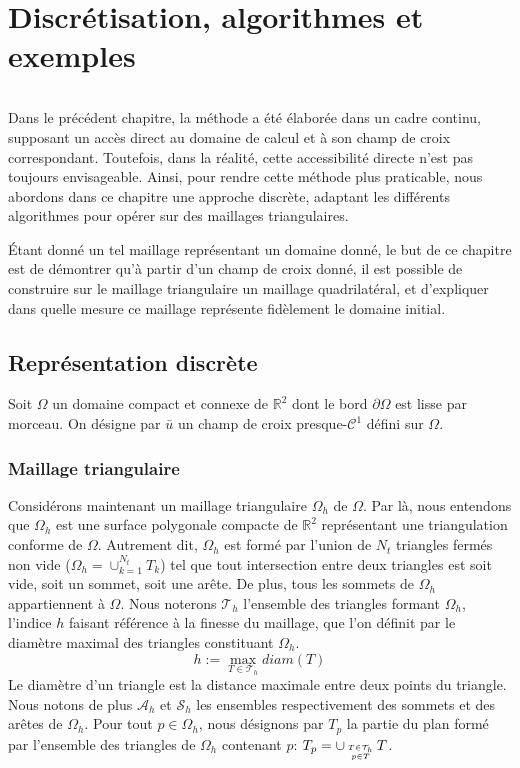 \chapter{Discrétisation, algorithmes et exemples}
\label{chap:alorithme}
\minitoc

\[\]

Dans le précédent chapitre, la méthode a été élaborée dans un cadre continu, supposant un accès direct au domaine de calcul et à son champ de croix correspondant. Toutefois, dans la réalité, cette accessibilité directe n'est pas toujours envisageable. Ainsi, pour rendre cette méthode plus praticable, nous abordons dans ce chapitre une approche discrète, adaptant les différents algorithmes pour opérer sur des maillages triangulaires.

\'Etant donné un tel maillage représentant un domaine donné, le but de ce chapitre est de démontrer qu'à partir d'un champ de croix donné, il est possible de construire sur le maillage triangulaire un maillage quadrilatéral, et d'expliquer dans quelle mesure ce maillage représente fidèlement le domaine initial.

\section{Représentation discrète}

Soit $\Omega$ un domaine compact et connexe de $\mathbb{R}^2$ dont le bord $\partial\Omega$ est lisse par morceau. On désigne par $\bar{u}$ un champ de croix presque-$\mathcal{C}^1$ défini sur $\Omega$.

\subsection{Maillage triangulaire}

Considérons maintenant un maillage triangulaire $\Omega_h$ de $\Omega$. Par là, nous entendons que $\Omega_h$ est une surface polygonale compacte de $\mathbb{R}^2$ représentant une triangulation conforme de $\Omega$. Autrement dit, $\Omega_h$ est formé par l'union de $N_t$ triangles fermés non vide ($\Omega_h=\cup_{k=1}^{N_t}T_k$) tel que tout intersection entre deux triangles est soit vide, soit un sommet, soit une arête. De plus, tous les sommets de $\Omega_h$ appartiennent à $\Omega$. Nous noterons $\mathcal{T}_h$ l'ensemble des triangles formant $\Omega_h$, l'indice $h$ faisant référence à la finesse du maillage, que l’on définit par le diamètre maximal des triangles constituant $\Omega_h$.
$$
h:=\max_{T\in\mathcal{T}_h} diam(T)
$$
Le diamètre d’un triangle est la distance maximale entre deux points du triangle. Nous notons de plus $\mathcal{A}_h$ et $\mathcal{S}_h$ les ensembles respectivement des sommets et des arêtes de $\Omega_h$. Pour tout $p\in\Omega_h$, nous désignons par $T_p$ la partie du plan formé par l'ensemble des triangles de $\Omega_h$ contenant $p$: $T_p=\displaystyle\cup_{T\in\mathcal{T}_h\atop~p\in T~}T$.


